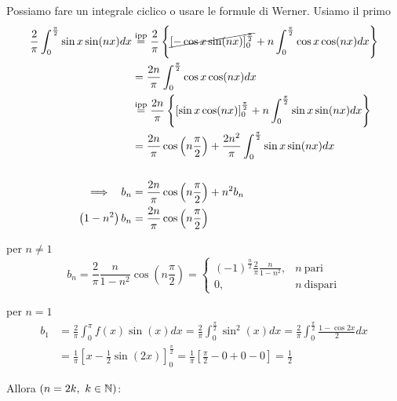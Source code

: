 \begin{enumerate}
Possiamo fare un integrale ciclico o usare le formule di Werner. Usiamo il primo
\begin{align*}
\frac{2}{\pi }\int ^{\frac{\pi }{2}}_{0}\sin x\sin(nx) dx & \overset{\text{ipp}}{ = }\frac{2}{\pi }\left\{\cancel{[ - \cos x\sin(nx)]^{\frac{\pi }{2}}_{0}} + n\int ^{\frac{\pi }{2}}_{0}\cos x\cos(nx) dx\right\}\\
 & = \frac{2n}{\pi }\int ^{\frac{\pi }{2}}_{0}\cos x\cos(nx) dx\\
 & \overset{\text{ipp}}{ = }\frac{2n}{\pi }\left\{[\sin x\cos(nx)]^{\frac{\pi }{2}}_{0} + n\int ^{\frac{\pi }{2}}_{0}\sin x\sin(nx) dx\right\}\\
 & = \frac{2n}{\pi }\cos\left(n\frac{\pi }{2}\right) + \frac{2n^{2}}{\pi }\int ^{\frac{\pi }{2}}_{0}\sin x\sin(nx) dx\\
 & \\
\implies \ \ b_{n} & = \frac{2n}{\pi }\cos\left(n\frac{\pi }{2}\right) + n^{2} b_{n}\\
\left(1 - n^{2}\right) b_{n} & = \frac{2n}{\pi }\cos\left(n\frac{\pi }{2}\right)
\end{align*}

per $n\neq 1$
\begin{equation*}
b_{n} = \frac{2}{\pi }\frac{n}{1 - n^{2}}\cos\left(n\frac{\pi }{2}\right) = 
\begin{cases}
(- 1)^{\frac{n}{2}}\frac{2}{\pi }\frac{n}{1 - n^{2}} , & n\ \text{pari}\\
0, & n\ \text{dispari}
\end{cases}
\end{equation*}

per $n = 1$
\begin{equation*}
\begin{aligned}
b_{1} & = \frac{2}{\pi }\int ^{\pi }_{0} f(x)\sin(x) dx = \frac{2}{\pi }\int ^{\frac{\pi }{2}}_{0}\sin^{2}(x) dx = \frac{2}{\pi }\int ^{\frac{\pi }{2}}_{0}\frac{1 - \cos 2x}{2} dx\\
 & = \frac{1}{\pi }\left[ x - \frac{1}{2}\sin(2x)\right]^{\frac{\pi }{2}}_{0} = \frac{1}{\pi }\left[\frac{\pi }{2} - 0 + 0 - 0\right] = \frac{1}{2}
\end{aligned}
\end{equation*}

Allora $(n = 2k,\ k\in \mathbb{N})$:


\end{enumerate}
